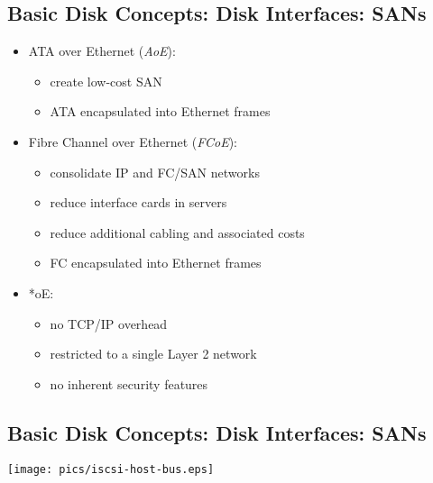 \documentclass[xga]{xdvislides}
\begin{document}
\subsection{Basic Disk Concepts: Disk Interfaces: SANs}
\begin{itemize}
	\item ATA over Ethernet ({\em AoE}):
		\begin{itemize}
			\item create low-cost SAN
			\item ATA encapsulated into Ethernet frames
		\end{itemize}
	\item Fibre Channel over Ethernet ({\em FCoE}):
		\begin{itemize}
			\item consolidate IP and FC/SAN networks
			\item reduce interface cards in servers
			\item reduce additional cabling and associated costs
			\item FC encapsulated into Ethernet frames
		\end{itemize}

	\item *oE:
		\begin{itemize}
			\item no TCP/IP overhead
			\item restricted to a single Layer 2 network
			\item no inherent security features
		\end{itemize}
\end{itemize}

\subsection{Basic Disk Concepts: Disk Interfaces: SANs}
\vfill
\begin{center}
	\texttt{[image: pics/iscsi-host-bus.eps]} \\
\end{center}
\vfill
\end{document}
